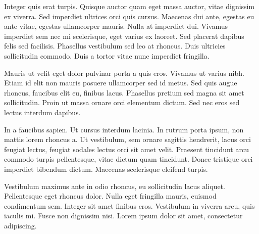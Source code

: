 Integer quis erat turpis. Quisque auctor quam eget massa auctor, vitae dignissim ex viverra. Sed imperdiet ultrices orci quis cursus. Maecenas dui ante, egestas eu ante vitae, egestas ullamcorper mauris. Nulla at imperdiet dui. Vivamus imperdiet sem nec mi scelerisque, eget varius ex laoreet. Sed placerat dapibus felis sed facilisis. Phasellus vestibulum sed leo at rhoncus. Duis ultricies sollicitudin commodo. Duis a tortor vitae nunc imperdiet fringilla.

Mauris ut velit eget dolor pulvinar porta a quis eros. Vivamus ut varius nibh. Etiam id elit non mauris posuere ullamcorper sed id metus. Sed quis augue rhoncus, faucibus elit eu, finibus lacus. Phasellus pretium sed magna sit amet sollicitudin. Proin ut massa ornare orci elementum dictum. Sed nec eros sed lectus interdum dapibus.

In a faucibus sapien. Ut cursus interdum lacinia. In rutrum porta ipsum, non mattis lorem rhoncus a. Ut vestibulum, sem ornare sagittis hendrerit, lacus orci feugiat lectus, feugiat sodales lectus orci sit amet velit. Praesent tincidunt arcu commodo turpis pellentesque, vitae dictum quam tincidunt. Donec tristique orci imperdiet bibendum dictum. Maecenas scelerisque eleifend turpis.

Vestibulum maximus ante in odio rhoncus, eu sollicitudin lacus aliquet. Pellentesque eget rhoncus dolor. Nulla eget fringilla mauris, euismod condimentum sem. Integer sit amet finibus eros. Vestibulum in viverra arcu, quis iaculis mi. Fusce non dignissim nisi. Lorem ipsum dolor sit amet, consectetur adipiscing. 

